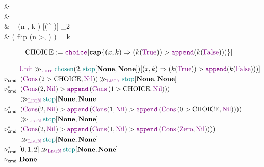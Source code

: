 \begin{codealign}
  &
    \polprd\ \type\ \Unittype\ \where
  \\[-4pt]
  &\quad
    \Unit
  \\
  &
    \
    \chosen
    (n \prd \Nat, k \con \ListNat)
    [\Unittype \times (\Bool \to^{\polprd} \ListNat)]
    \con
    \Unittype
    \coloneq \match_{2}
  \\[-4pt]
  &\quad
    \Unit
    \Rightarrow
    \left(
      \textsf{flip}
      \Rightarrow
      \Cons(n >, \Nil)
    \right)
    \mkCmd_{\ListNat}
    k
\end{codealign}

\begin{align*}
  \text{CHOICE}
  &:=
  \choice[\capab\{ (x, k) \Rightarrow (k(\True)) > \append (k(\False))) \}]
\end{align*}

\begin{align*}
  \phantom{\evaluatesto_{\cmd}}
  &
  \Unit
  \mkCmd_{\Unittype}
  \chosen(2, \stopListNat[\None, \None])
  [(x, k) \Rightarrow (k(\True)) > \append (k(\False)))]
  \\
  \evaluatesto_{\cmd}\
  &
  \left(
    \Cons
    \left(
      2 > \text{CHOICE},
      \Nil
    \right)
  \right)
  \mkCmd_{\ListNat}
  \stopListNat[\None, \None]
  \\
  \evaluatesto_{\cmd}^{\ast}\
  &
  \left(
    \Cons(2, \Nil)
    >
    \append
    \left(
      \Cons
      \left(
        1 > \text{CHOICE},
        \Nil
      \right)
    \right)
  \right)
  \\
  &
  \mkCmd_{\ListNat}
  \stopListNat[\None, \None]
  \\
  \evaluatesto_{\cmd}^{\ast}\
  &
  \left(
    \Cons(2, \Nil)
    >
    \append
    \left(
      \Cons(1, \Nil)
      >
      \append
      \left(
        \Cons
        \left(
          0 > \text{CHOICE},
          \Nil
        \right)
      \right)
    \right)
  \right)
  \\
  &
  \mkCmd_{\ListNat}
  \stopListNat[\None, \None]
  \\
  \evaluatesto_{\cmd}^{\ast}\
  &
  \left(
    \Cons(2, \Nil)
    >
    \append
    \left(
      \Cons(1, \Nil)
      >
      \append
      \left(
        \Cons
        \left(
          \Zero,
          \Nil
        \right)
      \right)
    \right)
  \right)
  \\
  &
  \mkCmd_{\ListNat}
  \stopListNat[\None, \None]
  \\
  \evaluatesto_{\cmd}^{\ast}\
  &
  [0,1,2]
  \mkCmd_{\ListNat}
  \stopListNat[\None, \None]
  \\
  \evaluatesto_{\cmd}\
  &
  \Done
\end{align*}
